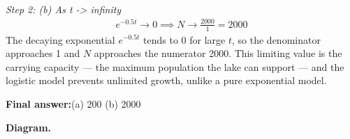 \documentclass[11pt]{article}
\begin{document}
\textit{Step 2: (b) As t -> infinity}
\[\begin{gathered}
e^{-0.5t} \to 0 \implies N \to \frac{2000}{1} = 2000
\end{gathered}\]
The decaying exponential \( e^{-0.5t} \) tends to 0 for large \( t \), so the denominator approaches 1 and \( N \) approaches the numerator 2000. This limiting value is the carrying capacity --- the maximum population the lake can support --- and the logistic model prevents unlimited growth, unlike a pure exponential model.

\begin{answerbox}
\textbf{Final answer:}\quad (a) 200 (b) 2000
\end{answerbox}
\textbf{Diagram.}

\begin{center}
\end{center}
\end{document}
